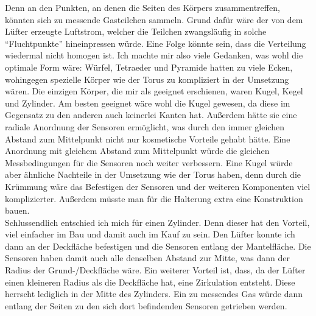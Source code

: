 \documentclass[10pt]{article}
\begin{document}
Denn an den Punkten, an denen die Seiten des Körpers zusammentreffen, könnten sich zu messende Gasteilchen sammeln.
Grund dafür wäre der von dem Lüfter erzeugte Luftstrom, welcher die Teilchen zwangsläufig in solche "`Fluchtpunkte"' hineinpressen würde.
Eine Folge könnte sein, dass die Verteilung wiedermal nicht homogen ist.
Ich machte mir also viele Gedanken, was wohl die optimale Form wäre: Würfel, Tetraeder und Pyramide hatten zu viele Ecken,
wohingegen spezielle Körper wie der Torus zu kompliziert in der Umsetzung wären.
Die einzigen Körper, die mir als geeignet erschienen, waren Kugel, Kegel und Zylinder. Am besten geeignet wäre wohl die Kugel
gewesen, da diese im Gegensatz zu den anderen auch keinerlei Kanten hat. Außerdem hätte sie eine radiale Anordnung der Sensoren ermöglicht, was durch den immer
gleichen Abstand zum Mittelpunkt nicht nur kosmetische Vorteile gehabt hätte. Eine Anordnung mit gleichem Abstand zum Mittelpunkt 
würde die gleichen Messbedingungen für die Sensoren noch weiter verbessern. Eine Kugel würde aber ähnliche Nachteile in der Umsetzung
wie der Torus haben, denn durch die Krümmung wäre das Befestigen der Sensoren und der weiteren
Komponenten viel komplizierter. Außerdem müsste man für die Halterung extra eine Konstruktion bauen.\\
Schlussendlich entschied ich mich für einen Zylinder. Denn dieser hat den Vorteil, viel einfacher
im Bau und damit auch im Kauf zu sein. Den Lüfter konnte ich dann an der Deckfläche befestigen und die Sensoren entlang
der Mantelfläche. Die Sensoren haben damit auch alle denselben Abstand zur Mitte, was dann der Radius der Grund-/Deckfläche wäre.
Ein weiterer Vorteil ist, dass, da der Lüfter einen kleineren Radius als die Deckfläche hat, eine Zirkulation entsteht. Diese herrscht lediglich in der Mitte
des Zylinders. Ein zu messendes Gas würde dann entlang der Seiten zu den sich dort befindenden Sensoren getrieben werden.\\
\end{document}
